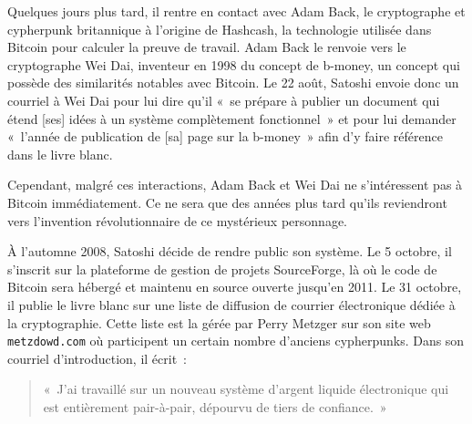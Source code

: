 Quelques jours plus tard, il rentre en contact avec Adam Back, le cryptographe et cypherpunk britannique à l'origine de Hashcash, la technologie utilisée dans Bitcoin pour calculer la preuve de travail. Adam Back le renvoie vers le cryptographe Wei Dai, inventeur en 1998 du concept de b-money, un concept qui possède des similarités notables avec Bitcoin. Le 22 août, Satoshi envoie donc un courriel à Wei Dai pour lui dire qu'il «~se prépare à publier un document qui étend [ses] idées à un système complètement fonctionnel~» et pour lui demander «~l'année de publication de [sa] page sur la b-money~» afin d'y faire référence dans le livre blanc.

Cependant, malgré ces interactions, Adam Back et Wei Dai ne s'intéressent pas à Bitcoin immédiatement. Ce ne sera que des années plus tard qu'ils reviendront vers l'invention révolutionnaire de ce mystérieux personnage.


À l'automne 2008, Satoshi décide de rendre public son système. Le 5 octobre, il s'inscrit sur la plateforme de gestion de projets SourceForge, là où le code de Bitcoin sera hébergé et maintenu en source ouverte jusqu'en 2011. Le 31 octobre, il publie le livre blanc sur une liste de diffusion de courrier électronique dédiée à la cryptographie. Cette liste est la  gérée par Perry Metzger sur son site web \verb?metzdowd.com? où participent un certain nombre d'anciens cypherpunks. Dans son courriel d'introduction, il écrit~:

\begin{quote}
«~J'ai travaillé sur un nouveau système d'argent liquide électronique qui est entièrement pair-à-pair, dépourvu de tiers de confiance.~»
\end{quote}

